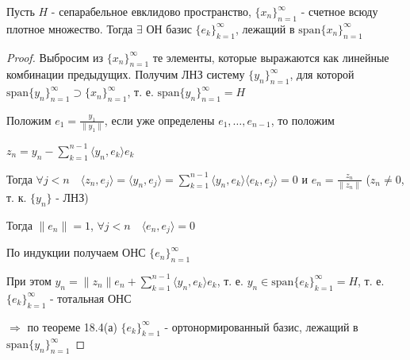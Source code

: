 \documentclass[a4paper,12pt]{report}
\begin{document}
\begin{thm}
Пусть $H$ - сепарабельное евклидово пространство, $\{x_n\}_{n=1}^\infty$ - счетное всюду плотное множество. Тогда $\exists$ ОН базис $\{e_k\}_{k=1}^\infty$, лежащий в $\mathrm{span}\{x_n\}_{n=1}^\infty$
\end{thm}
\begin{proof}
Выбросим из $\{x_n\}_{n=1}^\infty$ те элементы, которые выражаются как линейные комбинации предыдущих. Получим ЛНЗ систему $\{y_n\}_{n=1}^\infty$, для которой $\mathrm{span}\{y_n\}_{n=1}^\infty\supset\{x_n\}_{n=1}^\infty$, т. е. $\mathrm{span}\{y_n\}_{n=1}^\infty=H$

Положим $e_1=\displaystyle\frac{y_1}{\|y_1\|}$, если уже определены $e_1,\ldots,e_{n-1}$, то положим 

$z_n=y_n-\sum\limits_{k=1}^{n-1}\langle y_n,e_k\rangle e_k$

Тогда $\forall j<n\quad\langle z_n,e_j\rangle=\langle y_n,e_j\rangle=\sum\limits_{k=1}^{n-1}\langle y_n,e_k\rangle\langle e_k,e_j\rangle=0$ и $e_n=\displaystyle\frac{z_n}{\|z_n\|}$ ($z_n\ne0$, т. к. $\{y_n\}$ - ЛНЗ)

Тогда $\|e_n\|=1$, $\forall j<n\quad\langle e_n,e_j\rangle=0$

По индукции получаем ОНС $\{e_n\}_{n=1}^\infty$

При этом $y_n=\|z_n\|e_n+\sum\limits_{k=1}^{n-1}\langle y_n,e_k\rangle e_k$, т. е. $y_n\in\mathrm{span}\{e_k\}_{k=1}^\infty=H$, т. е. $\{e_k\}_{k=1}^\infty$ - тотальная ОНС

$\Rightarrow$ по теореме 18.4(а) $\{e_k\}_{k=1}^\infty$ - ортонормированный базис, лежащий в $\mathrm{span}\{y_n\}_{n=1}^\infty$
\end{proof}
 
\end{document}
